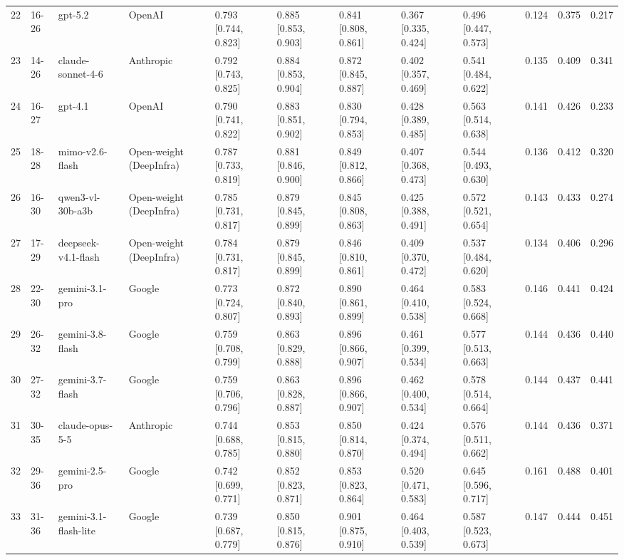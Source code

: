 \begin{table}
\begin{tabular}{rllllllllrrr}
22 & 16-26 & gpt-5.2 & OpenAI & 0.793 [0.744, 0.823] & 0.885 [0.853, 0.903] & 0.841 [0.808, 0.861] & 0.367 [0.335, 0.424] & 0.496 [0.447, 0.573] & 0.124 & 0.375 & 0.217 \\
23 & 14-26 & claude-sonnet-4-6 & Anthropic & 0.792 [0.743, 0.825] & 0.884 [0.853, 0.904] & 0.872 [0.845, 0.887] & 0.402 [0.357, 0.469] & 0.541 [0.484, 0.622] & 0.135 & 0.409 & 0.341 \\
24 & 16-27 & gpt-4.1 & OpenAI & 0.790 [0.741, 0.822] & 0.883 [0.851, 0.902] & 0.830 [0.794, 0.853] & 0.428 [0.389, 0.485] & 0.563 [0.514, 0.638] & 0.141 & 0.426 & 0.233 \\
25 & 18-28 & mimo-v2.6-flash & Open-weight (DeepInfra) & 0.787 [0.733, 0.819] & 0.881 [0.846, 0.900] & 0.849 [0.812, 0.866] & 0.407 [0.368, 0.473] & 0.544 [0.493, 0.630] & 0.136 & 0.412 & 0.320 \\
26 & 16-30 & qwen3-vl-30b-a3b & Open-weight (DeepInfra) & 0.785 [0.731, 0.817] & 0.879 [0.845, 0.899] & 0.845 [0.808, 0.863] & 0.425 [0.388, 0.491] & 0.572 [0.521, 0.654] & 0.143 & 0.433 & 0.274 \\
27 & 17-29 & deepseek-v4.1-flash & Open-weight (DeepInfra) & 0.784 [0.731, 0.817] & 0.879 [0.845, 0.899] & 0.846 [0.810, 0.861] & 0.409 [0.370, 0.472] & 0.537 [0.484, 0.620] & 0.134 & 0.406 & 0.296 \\
28 & 22-30 & gemini-3.1-pro & Google & 0.773 [0.724, 0.807] & 0.872 [0.840, 0.893] & 0.890 [0.861, 0.899] & 0.464 [0.410, 0.538] & 0.583 [0.524, 0.668] & 0.146 & 0.441 & 0.424 \\
29 & 26-32 & gemini-3.8-flash & Google & 0.759 [0.708, 0.799] & 0.863 [0.829, 0.888] & 0.896 [0.866, 0.907] & 0.461 [0.399, 0.534] & 0.577 [0.513, 0.663] & 0.144 & 0.436 & 0.440 \\
30 & 27-32 & gemini-3.7-flash & Google & 0.759 [0.706, 0.796] & 0.863 [0.828, 0.887] & 0.896 [0.866, 0.907] & 0.462 [0.400, 0.534] & 0.578 [0.514, 0.664] & 0.144 & 0.437 & 0.441 \\
31 & 30-35 & claude-opus-5-5 & Anthropic & 0.744 [0.688, 0.785] & 0.853 [0.815, 0.880] & 0.850 [0.814, 0.870] & 0.424 [0.374, 0.494] & 0.576 [0.511, 0.662] & 0.144 & 0.436 & 0.371 \\
32 & 29-36 & gemini-2.5-pro & Google & 0.742 [0.699, 0.771] & 0.852 [0.823, 0.871] & 0.853 [0.823, 0.864] & 0.520 [0.471, 0.583] & 0.645 [0.596, 0.717] & 0.161 & 0.488 & 0.401 \\
33 & 31-36 & gemini-3.1-flash-lite & Google & 0.739 [0.687, 0.779] & 0.850 [0.815, 0.876] & 0.901 [0.875, 0.910] & 0.464 [0.403, 0.539] & 0.587 [0.523, 0.673] & 0.147 & 0.444 & 0.451 \\

\end{tabular}
\end{table}
